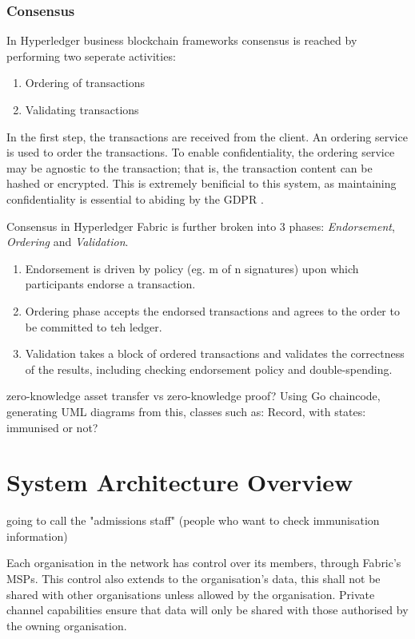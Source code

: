 \subsubsection{Consensus}

In Hyperledger business blockchain frameworks consensus is reached by performing two seperate activities:
\begin{enumerate}
  \item Ordering of transactions
  \item Validating transactions
\end{enumerate}
In the first step, the transactions are received from the client.
An ordering service is used to order the transactions. 
To enable confidentiality, the ordering service may be agnostic to the transaction; that is, the transaction content can be hashed or encrypted.\cite{noauthor_hyperledger_2017}
This is extremely benificial to this system, as maintaining confidentiality is essential to abiding by the GDPR \cite{noauthor_general_nodate}.

Consensus in Hyperledger Fabric is further broken into 3 phases: \emph{Endorsement}, \emph{Ordering} and \emph{Validation}.
\begin{enumerate}
  \item Endorsement is driven by policy (eg. m of n signatures) upon which participants endorse a transaction. 
  \item Ordering phase accepts the endorsed transactions and agrees to the order to be committed to teh ledger.
  \item Validation takes a block of ordered transactions and validates the correctness of the results, including checking endorsement policy and double-spending.
\end{enumerate}
zero-knowledge asset transfer vs zero-knowledge proof? \linebreak[1]
Using Go chaincode, generating UML diagrams from this, classes such as: Record, with states: immunised or not?

\section{System Architecture Overview}

going to call the "admissions staff" (people who want to check immunisation information) 

Each organisation in the network has control over its members, through Fabric's MSPs. 
This control also extends to the organisation's data, this shall not be shared with other organisations unless allowed by the organisation. 
Private channel capabilities ensure that data will only be shared with those authorised by the owning organisation. 

